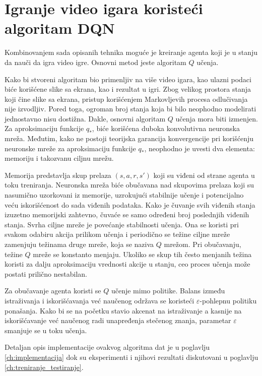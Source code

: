 \chapter{Igranje video igara koristeći algoritam DQN}
\label{ch:igranje}

Kombinovanjem sada opisanih tehnika moguće je kreiranje agenta koji je u stanju da nauči da igra video igre. Osnovni metod jeste algoritam $Q$ učenja. 
\par 
Kako bi stvoreni algoritam bio primenljiv na više video igara, kao ulazni podaci biće korišćene slike sa ekrana, kao i rezultat u igri. Zbog velikog prostora stanja koji čine slike sa ekrana, pristup korišćenjem Markovljevih procesa odlučivanja nije izvodljiv. Pored toga, ogroman broj stanja koja bi bilo neophodno modelirati jednostavno nisu dostižna.  Dakle, osnovni algoritam $Q$ učenja mora biti izmenjen. Za aproksimaciju funkcije $q_*$, biće korišćena duboka konvolutivna neuronska mreža. Međutim, kako ne postoji teorijska garancija konvergencije pri korišćenju neuronske mreže za aproksimaciju funkcije $q_*$, neophodno je uvesti dva elementa: memoriju i takozvanu ciljnu mrežu. 
\par 
Memorija predstavlja skup prelaza $(s, a, r, s')$ koji su viđeni od strane agenta u toku treniranja. Neuronska mreža biće obučavana nad skupovima prelaza koji su nasumično uzorkovani iz memorije, uzrokujući stabilnije učenje i potencijalno veću iskorišćenost do sada viđenih podataka. Kako je čuvanje svih viđenih stanja izuzetno memorijski zahtevno, čuvaće se samo određeni broj poslednjih viđenih stanja. Svrha ciljne mreže je povećanje stabilnosti učenja. Ona se koristi pri svakom odabiru akcija prilikom učenja i periodično se težine ciljne mreže zamenjuju težinama druge mreže, koja se naziva $Q$ mrežom. Pri obučavanju, težine $Q$ mreže se konstanto menjaju. Ukoliko se skup tih često menjanih težina koristi za dalju aproksimaciju vrednosti akcije u stanju, ceo proces učenja može postati prilično nestabilan. 
\par 
Za obučavanje agenta koristi se $Q$ učenje mimo politike. Balans između istraživanja i iskorišćavanja već naučenog održava se koristeći $\varepsilon$-pohlepnu politiku ponašanja. Kako bi se na početku stavio akcenat na istraživanje a kasnije na iskorišćavanje već naučenog radi unapređenja stečenog znanja, parametar $\varepsilon$ smanjuje se u toku učenja.
\par 
Detaljan opis implementacije ovakvog algoritma dat je u poglavlju \ref{ch:implementacija} dok su eksperimenti i njihovi rezultati diskutovani u poglavlju \ref{ch:treniranje_testiranje}.